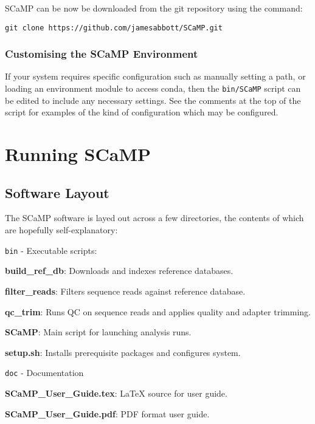 \documentclass[a4paper,10pt]{article}
\newenvironment{tight_itemize}{
\begin{itemize}
  \setlength{\itemsep}{0pt}
  \setlength{\parskip}{0pt}
}{\end{itemize}}
\begin{document}
SCaMP can be now be downloaded from the git repository using the command:                                           

{\tt git clone https://github.com/jamesabbott/SCaMP.git}

\subsubsection{Customising the SCaMP Environment}

If your system requires specific configuration such as manually setting a path,
or loading an environment module to access conda, then the {\tt bin/SCaMP}
script can be edited to include any necessary settings. See the comments at the
top of the script for examples of the kind of configuration which may be
configured.

\section{Running SCaMP}

\subsection{Software Layout}

The SCaMP software is layed out across a few directories, the contents of which are hopefully self-explanatory:

{\tt bin} - Executable scripts:
\begin{tight_itemize}
\item \textbf{build\_ref\_db}: Downloads and indexes reference databases.
\item \textbf{filter\_reads}: Filters sequence reads against reference database.
\item \textbf{qc\_trim}: Runs QC on sequence reads and applies quality and adapter trimming.
\item \textbf{SCaMP}: Main script for launching analysis runs.
\item \textbf{setup.sh}: Installs prerequisite packages and configures system.
\end{tight_itemize}

{\tt doc} - Documentation
\begin{tight_itemize}
\item \textbf{SCaMP\_User\_Guide.tex}: LaTeX source for user guide.
\item \textbf{SCaMP\_User\_Guide.pdf}: PDF format user guide.
\end{tight_itemize}
\end{document}
